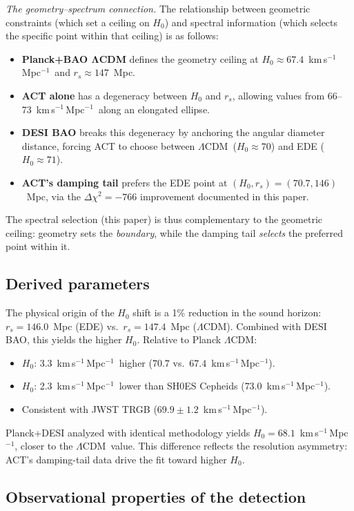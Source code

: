\documentclass[twocolumn,showpacs,preprintnumbers,amsmath,amssymb,prd]{revtex4-2}
\newcommand{\lcdm}{$\Lambda$CDM}
\newcommand{\kms}{km\,s$^{-1}$\,Mpc$^{-1}$}
\begin{document}
\emph{The geometry--spectrum connection.}
The relationship between geometric constraints (which set a ceiling 
on $H_0$) and spectral information (which selects the specific point within 
that ceiling) is as follows:
\begin{itemize}
\item \textbf{Planck+BAO ΛCDM} defines the geometry ceiling at 
$H_0 \approx 67.4$~\kms\ and $r_s \approx 147$~Mpc.
\item \textbf{ACT alone} has a degeneracy between $H_0$ and $r_s$, allowing 
values from 66--73~\kms\ along an elongated ellipse.
\item \textbf{DESI BAO} breaks this degeneracy by anchoring the angular 
diameter distance, forcing ACT to choose between \lcdm\ ($H_0 \approx 70$) 
and EDE ($H_0 \approx 71$).
\item \textbf{ACT's damping tail} prefers the EDE point at $(H_0, r_s) = 
(70.7, 146)$~Mpc, via the $\Delta\chi^2 = -766$ 
improvement documented in this paper.
\end{itemize}
The spectral selection (this paper) is thus complementary to the geometric 
ceiling: geometry sets the \emph{boundary}, while the damping tail 
\emph{selects} the preferred point within it.

\subsection{Derived parameters}

The physical origin of the $H_0$ shift is a 1\% reduction in the sound 
horizon: $r_s = 146.0$~Mpc (EDE) vs.\ $r_s = 147.4$~Mpc (\lcdm). Combined 
with DESI BAO, this yields the higher $H_0$. Relative to Planck \lcdm:
\begin{itemize}
\item $H_0$: 3.3~\kms\ higher ($70.7$ vs.\ $67.4$~\kms).
\item $H_0$: 2.3~\kms\ lower than SH0ES Cepheids ($73.0$~\kms).
\item Consistent with JWST TRGB ($69.9 \pm 1.2$~\kms).
\end{itemize}

Planck+DESI analyzed with identical methodology yields $H_0 = 68.1$~\kms, 
closer to the \lcdm\ value. This difference reflects the resolution asymmetry: 
ACT's damping-tail data drive the fit toward higher $H_0$.

\subsection{Observational properties of the detection}
\end{document}
